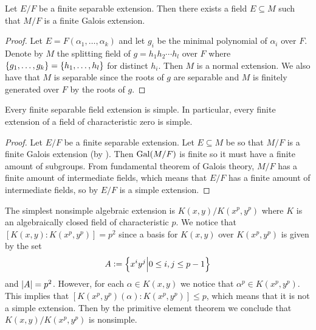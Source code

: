 \documentclass[11pt,a4paper]{article}
\begin{document}
\begin{lemma}
  \label{lem:primitive-element-theorem}
  Let $E/F$ be a finite separable extension.
  Then there exists a field $E \subseteq M$ such that $M/F$ is a finite
  Galois extension.
\end{lemma}
\begin{proof}
  Let $E = F(\alpha_1,\dots,\alpha_k)$ and let $g_i$
  be the minimal polynomial of $\alpha_i$ over $F$.
  Denote by $M$ the splitting field of $g = h_1h_2 \cdots h_l$
  over $F$ where $\left\{g_1,\dots,g_k\right\} = \left\{h_1,\dots,h_l\right\}$
  for distinct $h_i$.
  Then $M$ is a normal extension.
  We also have that $M$ is separable
  since the roots of $g$ are separable and $M$
  is finitely generated over $F$ by the roots of $g$.
\end{proof}

\begin{corollary}
  Every finite separable field extension is simple.
  In particular, every finite extension of a field of characteristic zero
  is simple.
\end{corollary}
\begin{proof}
  Let $E/F$ be a finite separable extension.
  Let $E \subseteq M$ be so that $M/F$ is a finite Galois extension
  (by ).
  Then $\operatorname{Gal}(M/F)$ is finite so it must have a finite amount of subgroups.
  From fundamental theorem of Galois theory, $M/F$ has a finite amount
  of intermediate fields, which means that $E/F$
  has a finite amount of intermediate fields, so by
  $E/F$ is a simple extension.
\end{proof}

\begin{example}
  The simplest nonsimple algebraic extension is $K(x,y)/K(x^p,y^p)$
  where $K$ is an algebraically closed field of characteristic $p$.
  We notice that $[K(x,y) : K(x^p,y^p)] = p^2$ since a basis
  for $K(x,y)$ over $K(x^p,y^p)$ is given by the set
  \[
    A := \left\{x^i y^j \middle\vert 0 \le i,j \le p-1\right\}
  \]
  and $\left\lvert A\right\rvert = p^2$.
  However, for each $\alpha \in K(x,y)$
  we notice that $\alpha^p \in K(x^p,y^p)$.
  This implies that $[K(x^p,y^p)(\alpha) : K(x^p,y^p)] \le p$,
  which means that it is not a simple extension.
  Then by the primitive element theorem
  we conclude that $K(x,y)/K(x^p,y^p)$ is nonsimple.
\end{example}
\end{document}
